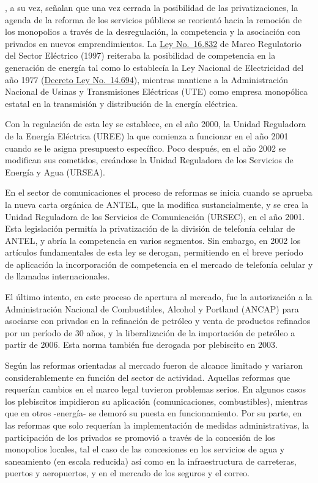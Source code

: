 \documentclass[
  12pt,
  spanish,
]{book}
\begin{document}
\citet{Forteza2003}, a su vez, señalan que una vez cerrada la
posibilidad de las privatizaciones, la agenda de la reforma de los
servicios públicos se reorientó hacia la remoción de los monopolios a
través de la desregulación, la competencia y la asociación con privados
en nuevos emprendimientos. La
\href{https://www.impo.com.uy/bases/leyes/16832-1997}{Ley No.~16.832} de
Marco Regulatorio del Sector Eléctrico (1997) reiteraba la posibilidad
de competencia en la generación de energía tal como lo establecía la Ley
Nacional de Electricidad del año 1977
(\href{https://www.impo.com.uy/bases/decretos-ley/14694-1977}{Decreto
Ley No.~14.694}), mientras mantiene a la Administración Nacional de
Usinas y Transmisiones Eléctricas (UTE) como empresa monopólica estatal
en la transmisión y distribución de la energía eléctrica.

Con la regulación de esta ley se establece, en el año 2000, la Unidad
Reguladora de la Energía Eléctrica (UREE) la que comienza a funcionar en
el año 2001 cuando se le asigna presupuesto específico. Poco después, en
el año 2002 se modifican sus cometidos, creándose la Unidad Reguladora
de los Servicios de Energía y Agua (URSEA).

En el sector de comunicaciones el proceso de reformas se inicia cuando
se aprueba la nueva carta orgánica de ANTEL, que la modifica
sustancialmente, y se crea la Unidad Reguladora de los Servicios de
Comunicación (URSEC), en el año 2001. Esta legislación permitía la
privatización de la división de telefonía celular de ANTEL, y abría la
competencia en varios segmentos. Sin embargo, en 2002 los artículos
fundamentales de esta ley se derogan, permitiendo en el breve período de
aplicación la incorporación de competencia en el mercado de telefonía
celular y de llamadas internacionales.

El último intento, en este proceso de apertura al mercado, fue la
autorización a la Administración Nacional de Combustibles, Alcohol y
Portland (ANCAP) para asociarse con privados en la refinación de
petróleo y venta de productos refinados por un período de 30 años, y la
liberalización de la importación de petróleo a partir de 2006. Esta
norma también fue derogada por plebiscito en 2003.

Según \citet{Bergara2005} las reformas orientadas al mercado fueron de
alcance limitado y variaron considerablemente en función del sector de
actividad. Aquellas reformas que requerían cambios en el marco legal
tuvieron problemas serios. En algunos casos los plebiscitos impidieron
su aplicación (comunicaciones, combustibles), mientras que en otros
-energía- se demoró su puesta en funcionamiento. Por su parte, en las
reformas que solo requerían la implementación de medidas
administrativas, la participación de los privados se promovió a través
de la concesión de los monopolios locales, tal el caso de las
concesiones en los servicios de agua y saneamiento (en escala reducida)
así como en la infraestructura de carreteras, puertos y aeropuertos, y
en el mercado de los seguros y el correo.
\end{document}
